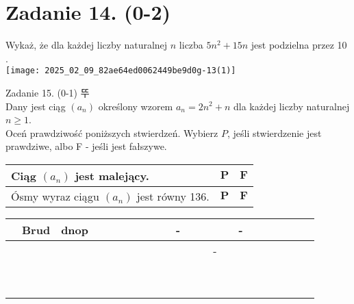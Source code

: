 \documentclass[10pt]{article}
\begin{document}
\section*{Zadanie 14. (0-2)}
Wykaż, że dla każdej liczby naturalnej \(n\) liczba \(5 n^{2}+15 n\) jest podzielna przez 10 .\\
\texttt{[image: 2025\_02\_09\_82ae64ed0062449be9d0g-13(1)]}

Zadanie 15. (0-1) 뚜\\
Dany jest ciąg \(\left(a_{n}\right)\) określony wzorem \(a_{n}=2 n^{2}+n\) dla każdej liczby naturalnej \(n \geq 1\).\\
Oceń prawdziwość poniższych stwierdzeń. Wybierz \(P\), jeśli stwierdzenie jest prawdziwe, albo F - jeśli jest fałszywe.

\begin{center}
\begin{tabular}{|l|c|c|}
\hline
Ciąg \(\left(a_{n}\right)\) jest malejący. & \(\mathbf{P}\) & \(\mathbf{F}\) \\
\hline
Ósmy wyraz ciągu \(\left(a_{n}\right)\) jest równy 136. & \(\mathbf{P}\) & \(\mathbf{F}\) \\
\hline
\end{tabular}
\end{center}

\begin{center}
\begin{tabular}{|c|c|c|c|c|c|c|c|c|c|c|c|c|c|c|c|c|c|c|c|c|c|}
\hline
 & Brud & dnop &  &  &  &  &  &  &  & - &  &  &  &  & - &  &  &  &  &  &  \\
\hline
 &  &  &  &  &  &  &  &  &  &  &  &  & - &  &  &  &  &  &  &  &  \\
\hline
 &  &  &  &  &  &  &  &  &  &  &  &  &  &  &  &  &  &  &  &  &  \\
\hline
 &  &  &  &  &  &  &  &  &  &  &  &  &  &  &  &  &  &  &  &  &  \\
\hline
 &  &  &  &  &  &  &  &  &  &  &  &  &  &  &  &  &  &  &  &  &  \\
\hline
 &  &  &  &  &  &  &  &  &  &  &  &  &  &  &  &  &  &  &  &  &  \\
\hline
 &  &  &  &  &  &  &  &  &  &  &  &  &  &  &  &  &  &  &  &  &  \\
\hline
 &  &  &  &  &  &  &  &  &  &  &  &  &  &  &  &  &  &  &  &  &  \\
\hline
 &  &  &  &  &  &  &  &  &  &  &  &  &  &  &  &  &  &  &  &  &  \\
\hline
 &  &  &  &  &  &  &  &  &  &  &  &  &  &  &  &  &  &  &  &  &  \\
\hline
 &  &  &  &  &  &  &  &  &  &  &  &  &  &  &  &  &  &  &  &  &  \\
\hline
\end{tabular}
\end{center}
\end{document}
